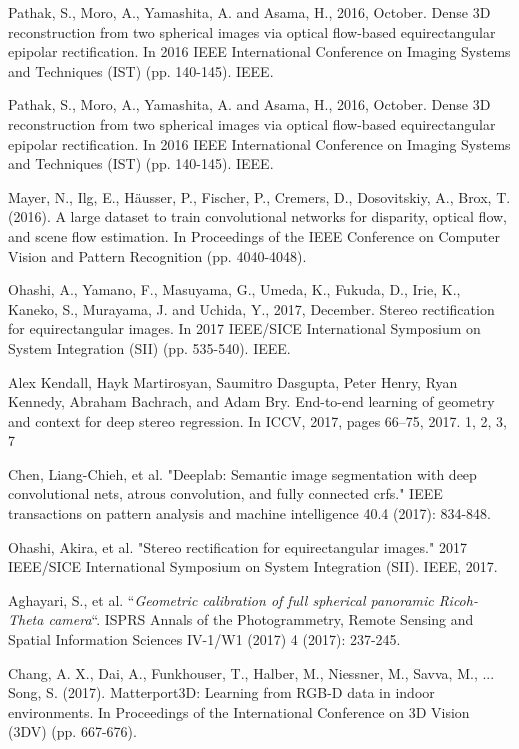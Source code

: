 \documentclass[english, LaM, oneside]{sapthesis}%
\begin{document}
\begin{thebibliography}{99}
Pathak, S., Moro, A., Yamashita, A. and Asama, H., 2016, October. Dense 3D reconstruction from two spherical images via optical flow-based equirectangular epipolar rectification. In 2016 IEEE International Conference on Imaging Systems and Techniques (IST) (pp. 140-145). IEEE.

Pathak, S., Moro, A., Yamashita, A. and Asama, H., 2016, October. Dense 3D reconstruction from two spherical images via optical flow-based equirectangular epipolar rectification. In 2016 IEEE International Conference on Imaging Systems and Techniques (IST) (pp. 140-145). IEEE.

 Mayer, N., Ilg, E., Häusser, P., Fischer, P., Cremers, D., Dosovitskiy, A., Brox, T. (2016). A large dataset to train convolutional networks for disparity, optical flow, and scene flow estimation. In Proceedings of the IEEE Conference on Computer Vision and Pattern Recognition (pp. 4040-4048).

Ohashi, A., Yamano, F., Masuyama, G., Umeda, K., Fukuda, D., Irie, K., Kaneko, S., Murayama, J. and Uchida, Y., 2017, December. Stereo rectification for equirectangular images. In 2017 IEEE/SICE International Symposium on System Integration (SII) (pp. 535-540). IEEE.

Alex Kendall, Hayk Martirosyan, Saumitro Dasgupta, Peter Henry, Ryan Kennedy, Abraham Bachrach, and Adam Bry. End-to-end learning of geometry and context for deep stereo regression. In ICCV, 2017, pages 66–75, 2017. 1, 2, 3, 7 

 Chen, Liang-Chieh, et al. "Deeplab: Semantic image segmentation with deep convolutional nets, atrous convolution, and fully connected crfs." IEEE transactions on pattern analysis and machine intelligence 40.4 (2017): 834-848.

 Ohashi, Akira, et al. "Stereo rectification for equirectangular images." 2017 IEEE/SICE International Symposium on System Integration (SII). IEEE, 2017.

 Aghayari, S., et al. “\textit{Geometric calibration of full spherical panoramic Ricoh-Theta camera}“. ISPRS Annals of the Photogrammetry, Remote Sensing and Spatial Information Sciences IV-1/W1 (2017) 4 (2017): 237-245.

 Chang, A. X., Dai, A., Funkhouser, T., Halber, M., Niessner, M., Savva, M., ... Song, S. (2017). Matterport3D: Learning from RGB-D data in indoor environments. In Proceedings of the International Conference on 3D Vision (3DV) (pp. 667-676).


\end{thebibliography}
\end{document}
